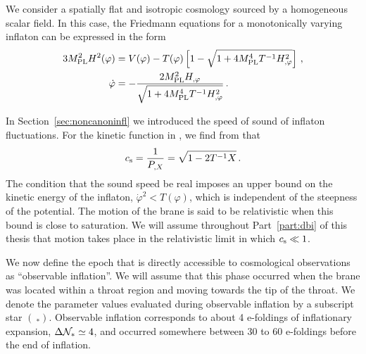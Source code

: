 We consider a spatially flat and isotropic cosmology 
sourced by a homogeneous scalar field. 
In this case, the Friedmann equations for a monotonically 
varying inflaton can be expressed in the form \cite{brane6} 
% 
\begin{align}
\label{eq:Friedmann-dbiintro}
3 M_{\mathrm{PL}}^2 H^2(\varphi ) &= V(\varphi ) -T(\varphi ) 
\left[ 1- \sqrt{1+4M_{\mathrm{PL}}^4T^{-1} H_{,\varphi}^2} \right] \,,\\
\label{eq:phidot-useful}
\dot{\varphi} &= - \frac{2M_{\mathrm{PL}}^2H_{,\varphi}}{\sqrt{1+4M_{\mathrm{PL}}^4 T^{-1} H_{,\varphi}^2}}
\,.
\end{align}
% 

In Section~\ref{sec:noncanoninfl} we introduced the speed of sound of
inflaton fluctuations. For the kinetic function in
, we find from
 that
% 
\begin{equation}
\label{eq:csdefn-dbiintro}
c_\mathrm{s} = \frac{1}{P_{,X}} = \sqrt{1 -2T^{-1}X}  \,.
\end{equation}
% 
The condition that the sound speed be real 
imposes an upper bound on the kinetic energy 
of the inflaton, $\dot{\varphi}^2 < T(\varphi)$, which 
is independent of the steepness of the potential.
The motion of the brane is said to be relativistic when this bound is 
close to saturation. We will assume throughout Part~\ref{part:dbi} of this thesis that motion takes
place in the relativistic limit in which $c_\mathrm{s}\ll1$. 
 
We now define the epoch that is directly 
accessible to cosmological observations as ``observable inflation''. 
We will assume that this phase 
occurred when the brane was located within a 
throat region and moving towards the tip of the throat. 
We denote the parameter values 
evaluated during observable inflation by a subscript star
$(~_*)$. Observable inflation corresponds to about 4 e-foldings  
of inflationary expansion, $\Delta \mathcal{N}_* \simeq 4$,
and occurred somewhere between 30 to 60 e-foldings before the
end of inflation. 


